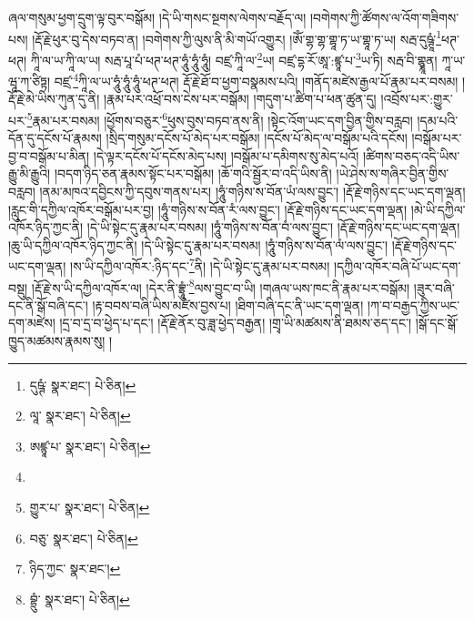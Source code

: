 ཞལ་གསུམ་ཕྱག་དྲུག་ལྟ་བུར་བསྒོམ། །དེ་ཡི་གསང་སྔགས་ལེགས་བརྗོད་ལ། །བགེགས་ཀྱི་ཚོགས་ལ་འོག་གཟིགས་པས། །རྡོ་རྗེ་ཕུར་བུ་དེས་བཏབ་ན། །བགེགས་ཀྱི་ལུས་ནི་མི་གཡོ་འགྱུར། །ཨོཾ་གྷ་གྷ་གྷཱ་ཏ་ཡ་གྷཱ་ཏ་ཡ། སརྦ་དུཥྚཱཾ་\footnote{དུཥྚཾ་  སྣར་ཐང་།  པེ་ཅིན། }ཕཊ་ཕཊ། ཀཱི་ལ་ཡ་ཀཱི་ལ་ཡ། སརྦ་པཱ་པཾ་ཕཊ་ཕཊ་ཧཱུཾ་ཧཱུཾ་ཧཱུཾ། བཛྲ་ཀཱི་ལ་\footnote{ལཱ་  སྣར་ཐང་།  པེ་ཅིན། }ཡ། བཛྲ་དྷ་རོ་ཨཱ་:ཛྙཱ་པ་\footnote{ཨཛྙཱ་པ་  སྣར་ཐང་།  པེ་ཅིན། }ཡ་ཏི། སརྦ་བི་གྷྣཱན། ཀཱ་ཡ་ཝཱ་ཀ་ཙིཏྟ། བཛྲ་\footnote{}ཀཱི་ལ་ཡ་ཧཱུཾ་ཧཱུཾ་ཧཱུཾ་ཕཊ་ཕཊ། རྡོ་རྗེ་ཐོ་བ་ཕྱག་བསྣམས་པའི། །གནོད་མཛེས་རྒྱལ་པོ་རྣམ་པར་བསམ། །རྡོ་རྗེ་མེ་ཡིས་ཀུན་དུ་ནི། །རྣམ་པར་འཕྲོ་བས་ངེས་པར་བསྒོམ། །གདུག་པ་ཚིག་པ་ཕན་ཚུན་དུ། །འབྲོས་པར་:གྱུར་པར་\footnote{གྱུར་པ་  སྣར་ཐང་།  པེ་ཅིན། }རྣམ་པར་བསམ། །ཕྱོགས་བཅུར་\footnote{བཅུ་  སྣར་ཐང་།  པེ་ཅིན། }ཕུས་བུས་བཏབ་ནས་ནི། །སྟེང་འོག་ཡང་དག་བྱིན་གྱིས་བརླབ། །དམ་པའི་དོན་དུ་དངོས་པོ་རྣམས། །སྲིད་གསུམ་དངོས་པོ་མེད་པར་བསྒོམ། །དངོས་པོ་མེད་ལ་བསྒོམ་པའི་དངོས། །བསྒོམ་པར་བྱ་བ་བསྒོམ་པ་མིན། །དེ་ལྟར་དངོས་པོ་དངོས་མེད་པས། །བསྒོམ་པ་དམིགས་སུ་མེད་པའོ། །ཚིགས་བཅད་འདི་ཡིས་རྒྱུ་མི་རྒྱུའི། །བདག་ཉིད་ཅན་རྣམས་སྟོང་པར་བསྒོམ། །ཆོ་གའི་སྦྱོར་བ་འདི་ཡིས་ནི། །ཡེ་ཤེས་ས་གཞིར་བྱིན་གྱིས་བརླབ། །ནམ་མཁའ་དབྱིངས་ཀྱི་དབུས་གནས་པར། །ཧཱུཾ་གཉིས་ས་བོན་ཡཾ་ལས་བྱུང་། །རྡོ་རྗེ་གཉིས་དང་ཡང་དག་ལྡན། །རླུང་གི་དཀྱིལ་འཁོར་བསྒོམ་པར་བྱ། །ཧཱུཾ་གཉིས་ས་བོན་རཾ་ལས་བྱུང་། །རྡོ་རྗེ་གཉིས་དང་ཡང་དག་ལྡན། །མེ་ཡི་དཀྱིལ་འཁོར་ཉིད་ཀྱང་ནི། །དེ་ཡི་སྟེང་དུ་རྣམ་པར་བསམ། །ཧཱུཾ་གཉིས་ས་བོན་བཾ་ལས་བྱུང་། །རྡོ་རྗེ་གཉིས་དང་ཡང་དག་ལྡན། །ཆུ་ཡི་དཀྱིལ་འཁོར་ཉིད་ཀྱང་ནི། །དེ་ཡི་སྟེང་དུ་རྣམ་པར་བསམ། །ཧཱུཾ་གཉིས་ས་བོན་ལཾ་ལས་བྱུང་། །རྡོ་རྗེ་གཉིས་དང་ཡང་དག་ལྡན། །ས་ཡི་དཀྱིལ་འཁོར་:ཉིད་དང་\footnote{ཉིད་ཀྱང་  སྣར་ཐང་། }ནི། །དེ་ཡི་སྟེང་དུ་རྣམ་པར་བསམ། །དཀྱིལ་འཁོར་བཞི་པོ་ཡང་དག་བསྡུ། །རྡོ་རྗེ་ས་ཡི་དཀྱིལ་འཁོར་ལ། །དེར་ནི་བྷྲཱུཾ་\footnote{བྷྲུཾ་  སྣར་ཐང་།  པེ་ཅིན། }ལས་བྱུང་བ་ཡི། །གཞལ་ཡས་ཁང་ནི་རྣམ་པར་བསྒོམ། །ཟུར་བཞི་དང་ནི་སྒོ་བཞི་དང་། །རྟ་བབས་བཞི་ཡིས་མཛེས་བྱས་པ། །ཐིག་བཞི་དང་ནི་ཡང་དག་ལྡན། །ཀ་བ་བརྒྱད་ཀྱིས་ཡང་དག་མཛེས། །དྲ་བ་དྲ་བ་ཕྱེད་པ་དང་། །རྡོ་རྗེ་ནོར་བུ་ཟླ་ཕྱེད་བརྒྱན། །གྲྭ་ཡི་མཚམས་ནི་ཐམས་ཅད་དང་། །སྒོ་དང་སྒོ་ཁྱུད་མཚམས་རྣམས་སུ། །
